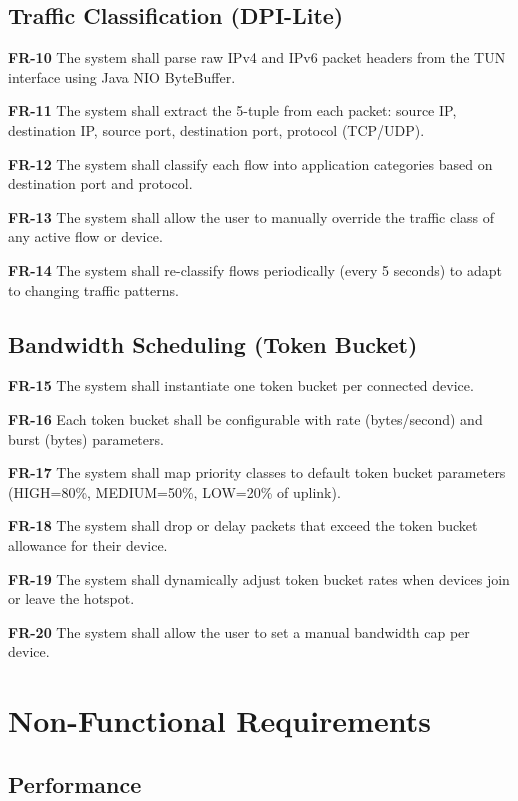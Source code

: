 \subsection{Traffic Classification (DPI-Lite)}

\textbf{FR-10} The system shall parse raw IPv4 and IPv6 packet headers from the TUN interface using Java NIO ByteBuffer.

\textbf{FR-11} The system shall extract the 5-tuple from each packet: source IP, destination IP, source port, destination port, protocol (TCP/UDP).

\textbf{FR-12} The system shall classify each flow into application categories based on destination port and protocol.

\textbf{FR-13} The system shall allow the user to manually override the traffic class of any active flow or device.

\textbf{FR-14} The system shall re-classify flows periodically (every 5 seconds) to adapt to changing traffic patterns.

\subsection{Bandwidth Scheduling (Token Bucket)}

\textbf{FR-15} The system shall instantiate one token bucket per connected device.

\textbf{FR-16} Each token bucket shall be configurable with rate (bytes/second) and burst (bytes) parameters.

\textbf{FR-17} The system shall map priority classes to default token bucket parameters (HIGH=80\%, MEDIUM=50\%, LOW=20\% of uplink).

\textbf{FR-18} The system shall drop or delay packets that exceed the token bucket allowance for their device.

\textbf{FR-19} The system shall dynamically adjust token bucket rates when devices join or leave the hotspot.

\textbf{FR-20} The system shall allow the user to set a manual bandwidth cap per device.

\section{Non-Functional Requirements}

\subsection{Performance}

